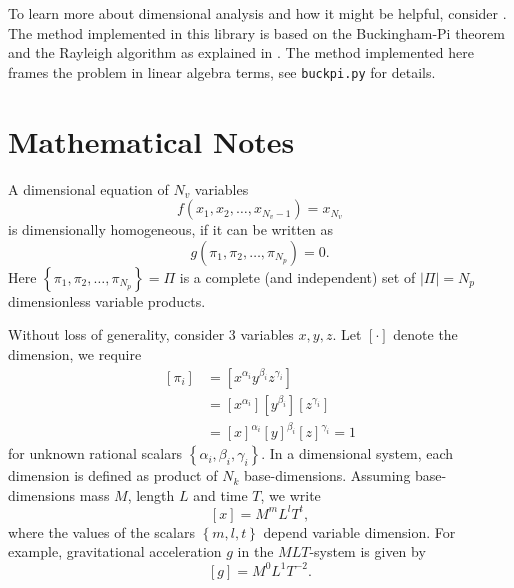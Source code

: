 \documentclass[11pt]{article}
\begin{document}
To learn more about dimensional analysis and how it might be helpful, consider \cite{szirtes2007applied, santiago2019first, sonin2001dimensional, lemons2017student,schetz1999fundamentals}. The method implemented in this library is based on the Buckingham-Pi theorem and the Rayleigh algorithm as explained in \cite{szirtes2007applied}. The method implemented here frames the problem in linear algebra terms, see \texttt{buckpi.py} for details.

\section{Mathematical Notes}
A dimensional equation of $N_v$ variables
\begin{equation}
    f(x_1,x_2,\ldots,x_{N_v-1}) = x_{N_v} \label{eq:fnc}
\end{equation}
is dimensionally homogeneous, if it can be written as
\begin{equation}
    g(\pi_1,\pi_2,\ldots,\pi_{N_p}) = 0.
\end{equation}
Here $\left\{\pi_1,\pi_2,\ldots,\pi_{N_p}\right\} = \Pi$ is a complete (and independent) set of $|\Pi|={N_p}$ dimensionless variable products. 

Without loss of generality, consider 3 variables $x,y,z$. Let $\left[\cdot\right]$ denote the dimension, we require
\begin{align}
    \left[\pi_i\right] &= \left[x^{\alpha_i}y^{\beta_i}z^{\gamma_i} \right] \\
    &=\left[x^{\alpha_i}\right]\left[y^{\beta_i}\right]\left[z^{\gamma_i}\right] \\
    &=\left[x\right]^{\alpha_i}\left[y\right]^{\beta_i}\left[z\right]^{\gamma_i} = 1 \label{eq:pi}    
\end{align}
for unknown rational scalars $\left\{\alpha_i,\beta_i,\gamma_i\right\}.$ In a dimensional system, each dimension is defined as product of $N_k$ base-dimensions. Assuming base-dimensions mass $M$, length $L$ and time $T$, we write 
\begin{equation}
    \left[x\right] = M^mL^lT^t, \label{eq:xinmlt}
\end{equation}
where the values of the scalars $\left\{m,l,t\right\}$ depend variable dimension. For example, gravitational acceleration $g$ in the $MLT$-system is given by
\begin{equation}
    \left[g\right] = M^0L^1T^{-2}.
\end{equation}
\end{document}
